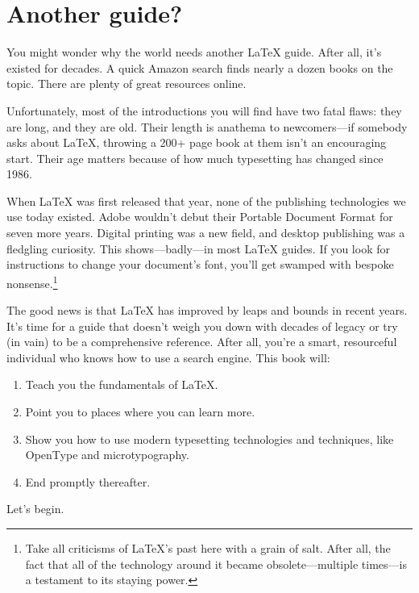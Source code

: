 \section{Another guide?}

You might wonder why the world needs another \LaTeX{} guide.
After all, it's existed for decades.
A quick Amazon search finds nearly a dozen books on the topic.
There are plenty of great resources online.

Unfortunately, most of the introductions you will find have two fatal flaws:
they are long, and they are old.
Their length is anathema to newcomers---if somebody asks about \LaTeX{},
throwing a 200+ page book at them isn't an encouraging start.
Their age matters because of how much typesetting has changed since 1986.

When \LaTeX{} was first released that year, none of the publishing technologies
we use today existed.
Adobe wouldn't debut their Portable Document Format for seven more years.
Digital printing was a new field, and desktop publishing was a fledgling
curiosity.\punckern{}
This shows---badly---in most \LaTeX{} guides.
If you look for instructions to change your document's font,
you'll get swamped with bespoke nonsense.\punckern\footnote{%
Take all criticisms of \LaTeX's past here with a grain of
salt. After all, the fact that all of the technology around it became
obsolete---multiple times---is a testament to its staying power.}

The good news is that  \LaTeX{} has improved by leaps and bounds in recent years.
It's time for a guide that doesn't weigh you down with decades of legacy
or try (in vain) to be a comprehensive reference.
After all, you're a smart, resourceful individual who knows how to use a search
engine.
This book will:

\begin{enumerate}
\item Teach you the fundamentals of \LaTeX.
\item Point you to places where you can learn more.
\item Show you how to use modern typesetting technologies and techniques,
    like OpenType and microtypography.
\item End promptly thereafter.
\end{enumerate}
\vspace{\baselineskip}

\noindent Let's begin.
